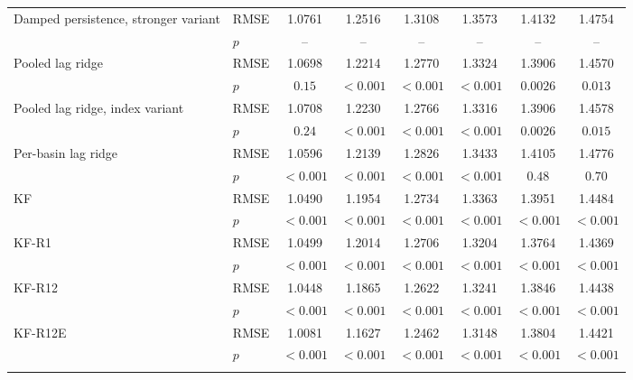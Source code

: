 \documentclass[hess, manuscript]{copernicus}
\begin{document}
\begin{table}[!htbp]
\begin{tabular}{@{}llcccccc@{}}
Damped persistence, stronger variant & RMSE & 1.0761 & 1.2516 & 1.3108 & 1.3573 & 1.4132 & 1.4754 \\
 & $p$ & -- & -- & -- & -- & -- & -- \\
Pooled lag ridge & RMSE & 1.0698 & 1.2214 & 1.2770 & 1.3324 & 1.3906 & 1.4570 \\
 & $p$ & $0.15$ & $<0.001$ & $<0.001$ & $<0.001$ & $0.0026$ & $0.013$ \\
Pooled lag ridge, index variant & RMSE & 1.0708 & 1.2230 & 1.2766 & 1.3316 & 1.3906 & 1.4578 \\
 & $p$ & $0.24$ & $<0.001$ & $<0.001$ & $<0.001$ & $0.0026$ & $0.015$ \\
Per-basin lag ridge & RMSE & 1.0596 & 1.2139 & 1.2826 & 1.3433 & 1.4105 & 1.4776 \\
 & $p$ & $<0.001$ & $<0.001$ & $<0.001$ & $<0.001$ & $0.48$ & $0.70$ \\
KF & RMSE & 1.0490 & 1.1954 & 1.2734 & 1.3363 & 1.3951 & 1.4484 \\
 & $p$ & $<0.001$ & $<0.001$ & $<0.001$ & $<0.001$ & $<0.001$ & $<0.001$ \\
KF-R1 & RMSE & 1.0499 & 1.2014 & 1.2706 & 1.3204 & 1.3764 & 1.4369 \\
 & $p$ & $<0.001$ & $<0.001$ & $<0.001$ & $<0.001$ & $<0.001$ & $<0.001$ \\
KF-R12 & RMSE & 1.0448 & 1.1865 & 1.2622 & 1.3241 & 1.3846 & 1.4438 \\
 & $p$ & $<0.001$ & $<0.001$ & $<0.001$ & $<0.001$ & $<0.001$ & $<0.001$ \\
KF-R12E & RMSE & 1.0081 & 1.1627 & 1.2462 & 1.3148 & 1.3804 & 1.4421 \\
 & $p$ & $<0.001$ & $<0.001$ & $<0.001$ & $<0.001$ & $<0.001$ & $<0.001$ \\
\bottomhline
\end{tabular}
\end{table}
\end{document}
